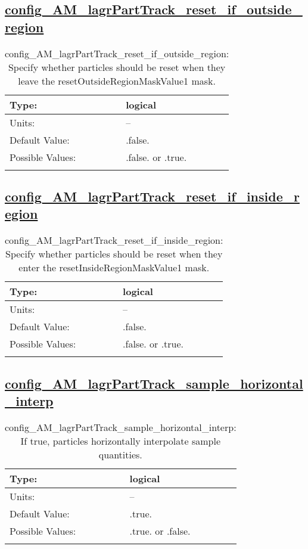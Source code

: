 \subsection[config\_AM\_lagrPartTrack\_reset\_if\_outside\_region]{\hyperref[sec:nm_tab_AM_lagrPartTrack]{config\_AM\_lagrPartTrack\_reset\_if\_outside\_region}}
\label{subsec:nm_sec_config_AM_lagrPartTrack_reset_if_outside_region}
\begin{center}
\begin{longtable}{| p{2.0in} || p{4.0in} |}
    \hline
    Type: & logical \\
    \hline
    Units: & -- \\
    \hline
    Default Value: & .false. \\
    \hline
    Possible Values: & .false. or .true. \\
    \hline
    \caption{config\_AM\_lagrPartTrack\_reset\_if\_outside\_region: Specify whether particles should be reset when they leave the resetOutsideRegionMaskValue1 mask.}
\end{longtable}
\end{center}
\subsection[config\_AM\_lagrPartTrack\_reset\_if\_inside\_region]{\hyperref[sec:nm_tab_AM_lagrPartTrack]{config\_AM\_lagrPartTrack\_reset\_if\_inside\_region}}
\label{subsec:nm_sec_config_AM_lagrPartTrack_reset_if_inside_region}
\begin{center}
\begin{longtable}{| p{2.0in} || p{4.0in} |}
    \hline
    Type: & logical \\
    \hline
    Units: & -- \\
    \hline
    Default Value: & .false. \\
    \hline
    Possible Values: & .false. or .true. \\
    \hline
    \caption{config\_AM\_lagrPartTrack\_reset\_if\_inside\_region: Specify whether particles should be reset when they enter the resetInsideRegionMaskValue1 mask.}
\end{longtable}
\end{center}
\subsection[config\_AM\_lagrPartTrack\_sample\_horizontal\_interp]{\hyperref[sec:nm_tab_AM_lagrPartTrack]{config\_AM\_lagrPartTrack\_sample\_horizontal\_interp}}
\label{subsec:nm_sec_config_AM_lagrPartTrack_sample_horizontal_interp}
\begin{center}
\begin{longtable}{| p{2.0in} || p{4.0in} |}
    \hline
    Type: & logical \\
    \hline
    Units: & -- \\
    \hline
    Default Value: & .true. \\
    \hline
    Possible Values: & .true. or .false. \\
    \hline
    \caption{config\_AM\_lagrPartTrack\_sample\_horizontal\_interp: If true, particles horizontally interpolate sample quantities.}
\end{longtable}
\end{center}
